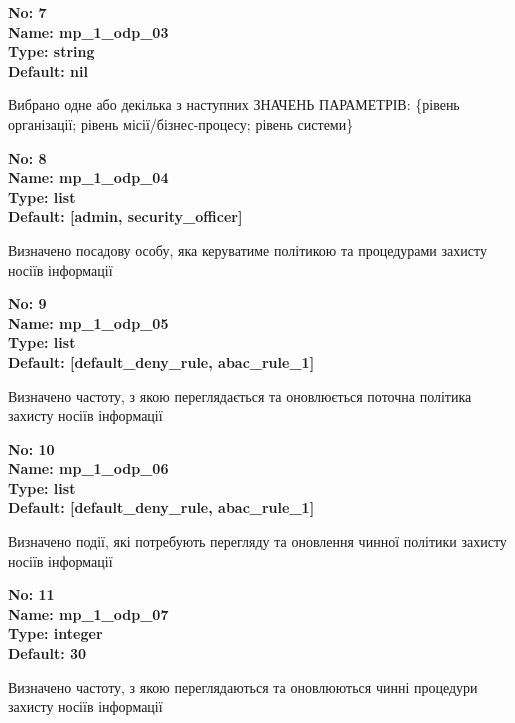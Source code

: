 \documentclass{article}
\begin{document}
{\footnotesize\bfseries
No: 7\\
Name: mp\_\allowbreak{}1\_\allowbreak{}odp\_\allowbreak{}03\\
Type: string\\
Default: nil
}

{\footnotesize Вибрано одне або декілька з наступних ЗНАЧЕНЬ ПАРАМЕТРІВ: \{рівень організації; рівень місії/бізнес-процесу; рівень системи\}}


{\footnotesize\bfseries
No: 8\\
Name: mp\_\allowbreak{}1\_\allowbreak{}odp\_\allowbreak{}04\\
Type: list\\
Default: [\textquotedbl{}admin\textquotedbl{}, \textquotedbl{}security\_\allowbreak{}officer\textquotedbl{}]
}

{\footnotesize Визначено посадову особу, яка керуватиме політикою та процедурами захисту носіїв інформації}


{\footnotesize\bfseries
No: 9\\
Name: mp\_\allowbreak{}1\_\allowbreak{}odp\_\allowbreak{}05\\
Type: list\\
Default: [\textquotedbl{}default\_\allowbreak{}deny\_\allowbreak{}rule\textquotedbl{}, \textquotedbl{}abac\_\allowbreak{}rule\_\allowbreak{}1\textquotedbl{}]
}

{\footnotesize Визначено частоту, з якою переглядається та оновлюється поточна політика захисту носіїв інформації}


{\footnotesize\bfseries
No: 10\\
Name: mp\_\allowbreak{}1\_\allowbreak{}odp\_\allowbreak{}06\\
Type: list\\
Default: [\textquotedbl{}default\_\allowbreak{}deny\_\allowbreak{}rule\textquotedbl{}, \textquotedbl{}abac\_\allowbreak{}rule\_\allowbreak{}1\textquotedbl{}]
}

{\footnotesize Визначено події, які потребують перегляду та оновлення чинної політики захисту носіїв інформації}


{\footnotesize\bfseries
No: 11\\
Name: mp\_\allowbreak{}1\_\allowbreak{}odp\_\allowbreak{}07\\
Type: integer\\
Default: 30
}

{\footnotesize Визначено частоту, з якою переглядаються та оновлюються чинні процедури захисту носіїв інформації}
\end{document}
